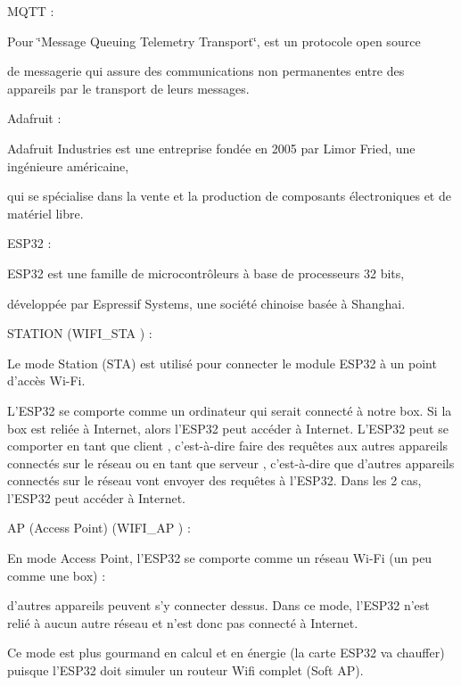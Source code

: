 MQTT \+:
\begin{DoxyItemize}
\item Pour \char`\"{}\+Message Queuing Telemetry Transport\char`\"{}, est un protocole open source
\item de messagerie qui assure des communications non permanentes entre des appareils par le transport de leurs messages.
\end{DoxyItemize}

Adafruit \+:
\begin{DoxyItemize}
\item Adafruit Industries est une entreprise fondée en 2005 par Limor Fried, une ingénieure américaine,
\item qui se spécialise dans la vente et la production de composants électroniques et de matériel libre. ~\newline

\end{DoxyItemize}

ESP32 \+:
\begin{DoxyItemize}
\item ESP32 est une famille de microcontrôleurs à base de processeurs 32 bits,
\item développée par Espressif Systems, une société chinoise basée à Shanghai.
\end{DoxyItemize}

STATION (WIFI\+\_\+\+STA ) \+:
\begin{DoxyItemize}
\item Le mode Station (STA) est utilisé pour connecter le module ESP32 à un point d’accès Wi-\/\+Fi.
\item L’\+ESP32 se comporte comme un ordinateur qui serait connecté à notre box. Si la box est reliée à Internet, alors l’\+ESP32 peut accéder à Internet. L’\+ESP32 peut se comporter en tant que client , c’est-\/à-\/dire faire des requêtes aux autres appareils connectés sur le réseau ou en tant que serveur , c’est-\/à-\/dire que d’autres appareils connectés sur le réseau vont envoyer des requêtes à l’\+ESP32. Dans les 2 cas, l’\+ESP32 peut accéder à Internet.
\end{DoxyItemize}

AP (Access Point) (WIFI\+\_\+\+AP ) \+:
\begin{DoxyItemize}
\item En mode Access Point, l’\+ESP32 se comporte comme un réseau Wi-\/\+Fi (un peu comme une box) \+:
\item d’autres appareils peuvent s’y connecter dessus. Dans ce mode, l’\+ESP32 n’est relié à aucun autre réseau et n’est donc pas connecté à Internet.
\item Ce mode est plus gourmand en calcul et en énergie (la carte ESP32 va chauffer) puisque l’\+ESP32 doit simuler un routeur Wifi complet (Soft AP). 
\end{DoxyItemize}